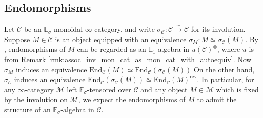 \documentclass{article}
\newcommand{\EE}{\mathbb{E}}
\theoremstyle{definition}
\begin{document}
\subsection{Endomorphisms} 
Let $ \mathcal{C} $ be an $ \EE_\sigma $-monoidal $ \infty $-category, and write $ \sigma_{\mathcal{C}} \colon \mathcal{C} \xrightarrow{\sim} \mathcal{C} $ for its involution. 
Suppose $ M \in \mathcal{C} $ is an object equipped with an equivalence $ \sigma_M \colon M \simeq \sigma_{\mathcal{C}}(M) $. 
By \cite[\S4.7.1]{LurHA}, endomorphisms of $ M $ can be regarded as an $ \EE_1 $-algebra in $ u\left(\mathcal{C}\right)^{\otimes} $, where $ u $ is from Remark \ref{rmk:assoc_inv_mon_cat_as_mon_cat_with_autoequiv}. 
Now $ \sigma_{M} $ induces an equivalence $ \mathrm{End}_{\mathcal{C}}(M) \simeq \mathrm{End}_{\mathcal{C}}(\sigma_{\mathcal{C}} (M)) $
On the other hand, $ \sigma_{\mathcal{C}} $ induces an equivalence $ \mathrm{End}_{\mathcal{C}}(\sigma_{\mathcal{C}} (M)) \simeq \mathrm{End}_{\mathcal{C}}(M)^{\mathrm{rev}} $. 
In particular, for any $ \infty $-category $ \mathcal{M} $ left $ \EE_\sigma $-tensored over $ \mathcal{C} $ and any object $ M \in \mathcal{M} $ which is fixed by the involution on $ \mathcal{M} $, we expect the endomorphisms of $ M $ to admit the structure of an $ \EE_\sigma $-algebra in $ \mathcal{C} $. 
\end{document}
